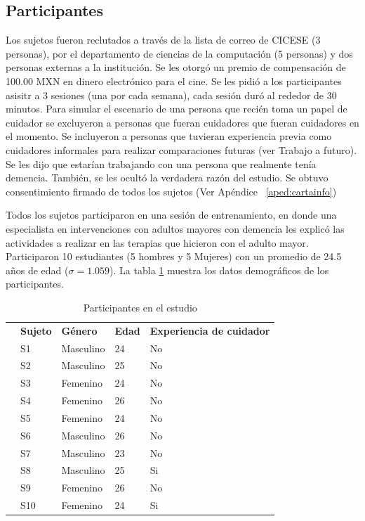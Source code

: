 \subsection{Participantes}\label{secc:subjects}
Los sujetos fueron reclutados a trav\'es de la lista de correo de CICESE (3 personas), por el departamento de ciencias de la computaci\'on (5 personas) y dos personas externas a la instituci\'on. Se les otorg\'o un premio de compensaci\'on de 100.00 MXN en dinero electr\'onico para el cine. Se les pidi\'o a los participantes asisitr a 3 sesiones (una por cada semana), cada sesi\'on dur\'o al rededor de 30 minutos. Para simular el escenario de una persona que reci\'en toma un papel de cuidador se excluyeron a personas que fueran cuidadores que fueran cuidadores en el momento. Se incluyeron a personas que tuvieran experiencia previa como cuidadores informales para realizar comparaciones futuras (ver Trabajo a futuro). Se les dijo que estar\'ian trabajando con una persona que realmente ten\'ia demencia. Tambi\'en, se les ocult\'o la verdadera raz\'on del estudio. Se obtuvo consentimiento firmado de todos los sujetos (Ver Ap\'endice ~\ref{aped:cartainfo})

Todos los sujetos participaron en una sesi\'on de entrenamiento, en donde una especialista en intervenciones con adultos mayores con demencia les explic\'o las actividades a realizar en las terapias que hicieron con el adulto mayor.
Participaron 10 estudiantes (5 hombres y 5 Mujeres) con un promedio de 24.5 a\~nos de edad ($\sigma=1.059$). La tabla \ref{table:kysymys} muestra los datos demogr\'aficos de los participantes.
\begin{table}
	\footnotesize
	\centering
	\caption{Participantes en el estudio}
	\label{table:kysymys}
	\begin{tabular}{m{0.2cm}m{2.5cm}m{2.5cm}m{2.5cm}m{2.5cm}}
		\hline\noalign{\smallskip}
		 & \textbf{Sujeto} & \textbf{G\'enero} & \textbf{Edad} & \textbf{Experiencia de cuidador}
		\\ \noalign{\smallskip}
		\hline
		\noalign{\smallskip}
		&S1& Masculino & 24 & No   \\ 
		&S2& Masculino &  25&  No  \\ 
		&S3& Femenino & 24 & No   \\ 
		&S4& Femenino & 26 & No  \\ 
		&S5& Femenino & 24 & No   \\ 
		&S6& Masculino & 26 &  No  \\ 
		&S7& Masculino & 23 &  No \\ 
		&S8& Masculino & 25 &  Si  \\ 
		&S9& Femenino & 26 & No   \\ 
	  	&S10& Femenino & 24 & Si  \\ 
		\hline
	\end{tabular}
\end{table}
